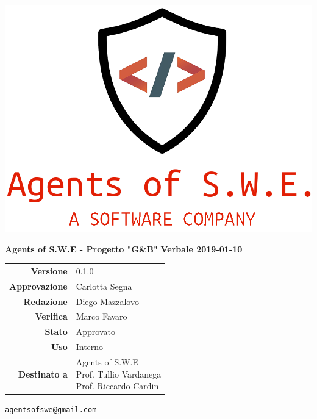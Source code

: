 


\begin{titlepage}
\thispagestyle{empty}

\begin{center}


\includegraphics[scale=0.3]{./images/logo.png} 


\large \textbf{Agents of S.W.E - Progetto "G\&B"}
\vfill
\Huge \textbf{Verbale 2019-01-10}
\vfill
\large
\renewcommand{\arraystretch}{1.3}
\begin{tabular}{r|l}
\textbf{Versione} & 0.1.0\\
\textbf{Approvazione} & Carlotta Segna\\
\textbf{Redazione} & \parbox[t]{5cm}{Diego Mazzalovo}\\
\textbf{Verifica} & \parbox[t]{5cm}{Marco Favaro}\\
\textbf{Stato} & Approvato\\
\textbf{Uso} & Interno\\
\textbf{Destinato a} & \parbox[t]{5cm}{Agents of S.W.E \\Prof. Tullio Vardanega\\Prof. Riccardo Cardin}
\end{tabular}
\vfill
\small
\texttt{agentsofswe@gmail.com}
\end{center}
\end{titlepage}

\pagebreak



\pagebreak


\pagebreak
	

\pagebreak




